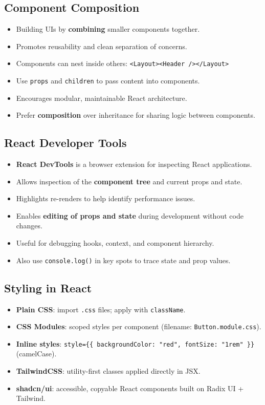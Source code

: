\documentclass[hidelinks]{article}
\begin{document}
\subsection{Component Composition}
\begin{itemize}
  \item Building UIs by \textbf{combining} smaller components together.
  \item Promotes reusability and clean separation of concerns.
  \item Components can nest inside others: \texttt{<Layout><Header /></Layout>}
  \item Use \texttt{props} and \texttt{children} to pass content into components.
  \item Encourages modular, maintainable React architecture.
  \item Prefer \textbf{composition} over inheritance for sharing logic between components.
\end{itemize}

\subsection{React Developer Tools}
\begin{itemize}
  \item \textbf{React DevTools} is a browser extension for inspecting React applications.
  \item Allows inspection of the \textbf{component tree} and current props and state.
  \item Highlights re-renders to help identify performance issues.
  \item Enables \textbf{editing of props and state} during development without code changes.
  \item Useful for debugging hooks, context, and component hierarchy.
  \item Also use \texttt{console.log()} in key spots to trace state and prop values.
\end{itemize}

\subsection{Styling in React}
\begin{itemize}
  \item \textbf{Plain CSS}: import \texttt{.css} files; apply with \texttt{className}.
  \item \textbf{CSS Modules}: scoped styles per component (filename: \texttt{Button.module.css}).
  \item \textbf{Inline styles}: \texttt{style=\{\{ backgroundColor: "red", fontSize: "1rem" \}\}} (camelCase).
  \item \textbf{TailwindCSS}: utility-first classes applied directly in JSX.
  \item \textbf{shadcn/ui}: accessible, copyable React components built on Radix UI + Tailwind.
\end{itemize}
\end{document}
